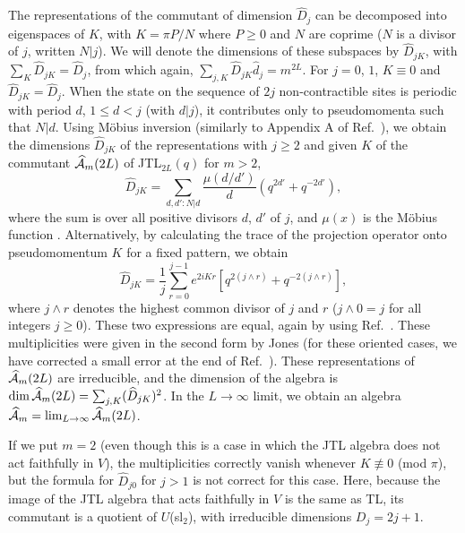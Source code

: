 \documentclass[twocolumn,floats,pra]{revtex4}
\def \hcA {\widehat{\cal A}}
\newcommand {\be}{\begin{equation}}
\newcommand {\ee} {\end{equation}}
\begin{document}
The representations of the commutant of dimension $\widehat{D}_j$
can be decomposed into eigenspaces of $K$, with $K=\pi P/N$ where
$P\geq 0$ and $N$ are coprime ($N$ is a divisor of $j$, written
$N|j$). We will denote the dimensions of these subspaces by
$\widehat{D}_{jK}$, with $\sum_K \widehat{D}_{jK}=\widehat{D}_j$,
from which again, $\sum_{j,K} \widehat{D}_{jK}
\widehat{d}_j=m^{2L}$. For $j=0$, $1$, $K\equiv0$ and
$\widehat{D}_{jK}=\widehat{D}_j$. When the state on the sequence
of $2j$ non-contractible sites is periodic with period $d$, $1\leq
d<j$ (with $d|j$), it contributes only to pseudomomenta such that
$N|d$. Using M\"{o}bius inversion \cite{hw} (similarly to Appendix
A of Ref.\ \cite{rs}), we obtain the dimensions $\widehat{D}_{jK}$
of the representations with $j\geq2$ and given $K$ of the
commutant $\hcA_m(2L)$ of
JTL$_{2L}(q)$ for $m>2$,%
\be
\widehat{D}_{jK}=\sum_{d,d':N|d}\frac{\mu(d/d')}{d}(q^{2d'}+q^{-2d'}
),\ee%
where the sum is over all positive divisors $d$, $d'$ of $j$, and
$\mu(x)$ is the M\"{o}bius function \cite{hw}. Alternatively, by
calculating the trace of the projection operator
onto pseudomomentum $K$ for a fixed pattern, we obtain%
\be%
\widehat{D}_{jK}
=\frac{1}{j}\sum_{r=0}^{j-1}e^{2iKr}\left[q^{2(j\wedge
r)}+q^{-2(j\wedge r)}\right],\label{Djkn=0}\ee %
where $j\wedge r$ denotes the highest common divisor of $j$ and
$r$ ($j\wedge0=j$ for all integers $j\geq0$). These two
expressions are equal, again by using Ref.\ \cite{hw}. These
multiplicities were given in the second form by Jones
\cite{jones2} (for these oriented cases, we have corrected a small
error at the end of Ref.\ \cite{jones2}). These representations of
$\hcA_m(2L)$ are irreducible, and the dimension of the algebra is
${\rm dim\,}\hcA_m(2L)=\sum_{j,K}(\widehat{D}_{jK})^2$. In the
$L\to\infty$ limit, we obtain an algebra
$\hcA_m=\lim_{L\to\infty}\hcA_m(2L)$.

If we put $m=2$ (even though this is a case in which the JTL
algebra does not act faithfully in $V$), the multiplicities
correctly vanish whenever $K\not\equiv 0$ (mod $\pi$), but the
formula for $\widehat{D}_{j0}$ for $j>1$ is not correct for this
case. Here, because the image of the JTL algebra that acts
faithfully in $V$ is the same as TL, its commutant is a quotient
of $U$(sl$_2$), with irreducible dimensions $D_j=2j+1$.
\end{document}
